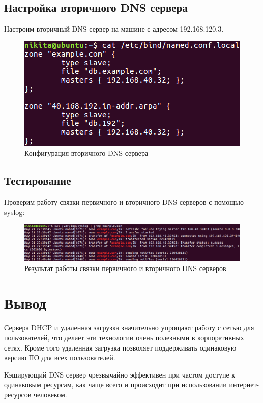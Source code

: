 \documentclass[14pt,a4paper,report]{report}
\begin{document}
\clearpage

\subsection{Настройка вторичного DNS сервера}

Настроим вторичный DNS сервер на машине с адресом 192.168.120.3.

\begin{figure}[h!]
	\centering
	\includegraphics[scale = 0.9]{images/4_4.png}
	\caption{Конфигурация вторичного DNS сервера}
	\label{image:21}
\end{figure}

\subsection{Тестирование}

Проверим работу связки первичного и вторичного DNS серверов с помощью syslog:

\begin{figure}[h!]
	\centering
	\includegraphics[scale = 0.6]{images/4_5.png}
	\caption{Результат работы связки первичного и вторичного DNS серверов}
	\label{image:22}
\end{figure}


\section{Вывод}

Сервера DHCP и удаленная загрузка значительно упрощают работу с сетью для пользователей, что делает эти технологии очень полезными в корпоративных сетях. Кроме того удаленная загрузка позволяет поддерживать одинаковую версию ПО для всех пользователей.

Кэширующий DNS сервер чрезвычайно эффективен при частом доступе к одинаковым ресурсам, как чаще всего и происходит при использовании интернет-ресурсов человеком.
\end{document}
